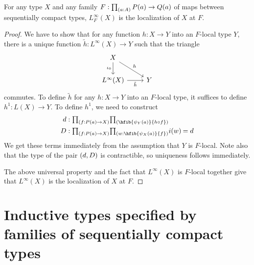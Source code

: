 \begin{thm}
For any type $X$ and any family $F:\prd{a:A}P(a)\to Q(a)$ of maps between
sequentially compact types, $L_F^\infty(X)$ is the localization of $X$ at $F$.
\end{thm}

\begin{proof}
We have to show that for any function $h:X\to Y$ into an
$F$-local type $Y$, there is a unique function $\tilde{h}: L^\infty(X)\to
Y$ such that the triangle
\begin{equation*}
\begin{tikzcd}
X \arrow[dr,"h"] \arrow[d,swap,"\iota_0"] \\ 
L^\infty(X) \arrow[r,swap,"\tilde{h}"] & Y
\end{tikzcd}
\end{equation*}
commutes. To define $\tilde{h}$ for any $h:X\to Y$ into an $F$-local type, 
it suffices to define $h^1:L(X)\to Y$. To define $h^1$, we need to construct
\begin{align*}
d & : \prd{f:P(a)\to X} \hfib{\psi_Y(a)}{h\circ f}\\
D & : \prd{f:P(a)\to X}{w:\hfib{\psi_{X}(a)}{f}}\id{i(w)}{d}
\end{align*}
We get these terms immediately from the assumption that $Y$ is $F$-local.
Note also that the type of the pair ${\mathopen{}(d,D)\mathclose{}}$ is contractible, so uniqueness
follows immediately.

The above universal property and the fact that $L^\infty(X)$ is $F$-local
together give that $L^\infty(X)$ is the localization of $X$ at $F$.
\end{proof}

\section{Inductive types specified by families of sequentially compact types}
